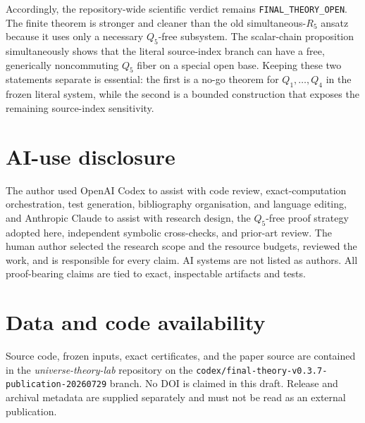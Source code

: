 \documentclass[11pt]{article}
\theoremstyle{remark}
\theoremstyle{plain}
\newcommand{\artifact}[1]{\texttt{\small #1}}
\begin{document}
Accordingly, the repository-wide scientific verdict remains
\artifact{FINAL\_THEORY\_OPEN}.  The finite theorem is stronger and cleaner
than the old simultaneous-\(R_5\) ansatz because it uses only a necessary
\(Q_5\)-free subsystem.  The scalar-chain proposition simultaneously shows
that the literal source-index branch can have a free, generically
noncommuting \(Q_5\) fiber on a special open base.  Keeping these two
statements separate is essential: the first is a no-go theorem for
\(Q_1,\ldots,Q_4\) in the frozen literal system, while the second is a
bounded construction that exposes the remaining source-index sensitivity.

\section*{AI-use disclosure}

The author used OpenAI Codex to assist with code review, exact-computation
orchestration, test generation, bibliography organisation, and language
editing, and Anthropic Claude to assist with research design, the
\(Q_5\)-free proof strategy adopted here, independent symbolic
cross-checks, and prior-art review.  The human author selected the research
scope and the resource budgets, reviewed the work, and is responsible for
every claim.  AI systems are not listed as authors.  All proof-bearing
claims are tied to exact, inspectable artifacts and tests.

\section*{Data and code availability}

Source code, frozen inputs, exact certificates, and the paper source are
contained in the \emph{universe-theory-lab} repository on the
\artifact{codex/final-theory-v0.3.7-publication-20260729} branch.  No DOI
is claimed in this draft.  Release and archival metadata are supplied
separately and must not be read as an external publication.



\end{document}
